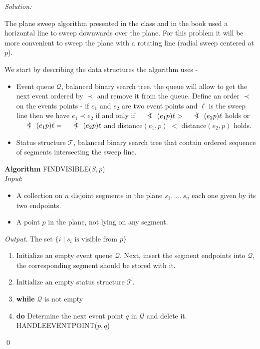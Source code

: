 \documentclass[a4paper, 8pt, oneside]{article}
\newcommand{\arcangle}{\mathord{\mathpalette\doarcangle\relax}}
\newcommand{\doarcangle}[2]{%
  \hbox{%
    \sbox0{$#1B$}%
    \sbox2{$#1<$}%
    \raisebox{\dimexpr\dp2+(\ht0-\ht2)/2}{%
      $#1<\mspace{-9mu}\mathrel{)}\mspace{2mu}$%
    }%
  }%
}
\newenvironment{sol}
    {\emph{Solution:}
    }
    {
    \qed
    }
\begin{document}
\begin{enumerate}
\begin{sol}
The plane sweep algorithm  presented in the class and in the book \cite[Chapter 2]{computationalbook} used a horizontal line to sweep downwards over the plane. For this problem it will be more convenient to sweep the plane with a rotating line (radial sweep centered at $p$).

We start by describing the data structures the algorithm uses -
 \begin{itemize}
   \item Event queue $\mathcal{Q}$, balanced binary search tree, 
   the queue will allow to get the next event ordered by $\prec$ and remove it from the queue.
   Define an order $\prec$ on the events points - if $e_1$ and $e_2$ are two event points and $\ell$ is the sweep line then we have $e_1 \prec e_2$ if and only if $\arcangle (e_1 p) \ell > \arcangle (e_2 p) \ell$ holds or $\arcangle (e_1 p) \ell = \arcangle (e_2 p) \ell$ and distance$(e_1, p)$ $<$ distance$(e_2, p)$ holds.
  \item Status structure $\mathcal{T}$, balanced binary search tree that contain ordered sequence of segments intersecting the sweep line.
\end{itemize}

\textbf{Algorithm} FINDVISIBLE$(S, p$)\\
\textit{Input}:
 \begin{itemize}
  \item A collection on $n$ disjoint segments in the plane $s_1, \ldots, s_n$ each one given by its two endpoints.
  \item A point $p$ in the plane, not lying on any segment.
\end{itemize}
\textit{Output}. The set $\{ i \mid s_i \text{ is visible from } p\}$ \\
\begin{enumerate}
\item Initialize an empty event queue $\mathcal{Q}$. Next, insert the segment endpoints into $\mathcal{Q}$, the corresponding segment should be stored with it.
\item Initialize an empty status structure $\mathcal{T}$.
\item \quad \textbf{while} $\mathcal{Q}$ is not empty
\item \quad \quad \textbf{do} Determine the next event point $q$ in $\mathcal{Q}$ and delete it. HANDLEEVENTPOINT($p, q$)
\end{enumerate}


\end{sol}
\end{enumerate}
\end{document}
